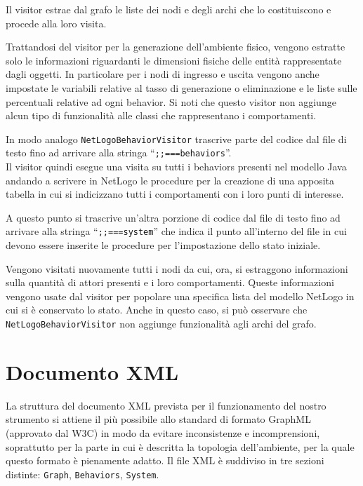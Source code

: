 Il visitor estrae dal grafo le liste dei nodi e degli archi che lo costituiscono e procede alla loro visita.

Trattandosi del visitor per la generazione dell'ambiente fisico, vengono estratte solo le informazioni riguardanti le dimensioni fisiche delle entità rappresentate dagli oggetti. In particolare per i nodi di ingresso e uscita vengono anche impostate le variabili relative al tasso di generazione o eliminazione e le liste sulle percentuali relative ad ogni behavior. Si noti che questo visitor non aggiunge alcun tipo di funzionalità alle classi che rappresentano i comportamenti.

In modo analogo \texttt{NetLogoBehaviorVisitor} trascrive parte del codice dal file di testo fino ad arrivare alla stringa “\texttt{;;===behaviors}”.\\
Il visitor quindi esegue una visita su tutti i behaviors presenti nel modello Java andando a scrivere in NetLogo le procedure per la creazione di una apposita tabella in cui si indicizzano tutti i comportamenti con i loro punti di interesse.

A questo punto si trascrive un'altra porzione di codice dal file di testo fino ad arrivare alla stringa “\texttt{;;===system}” che indica il punto all'interno del file in cui devono essere inserite le procedure per l'impostazione dello stato iniziale.

Vengono visitati nuovamente tutti i nodi da cui, ora, si estraggono informazioni sulla quantità di attori presenti e i loro comportamenti. Queste informazioni vengono usate dal visitor per popolare una specifica lista del modello NetLogo in cui si è conservato lo stato. Anche in questo caso, si può osservare che \texttt{NetLogoBehaviorVisitor} non aggiunge funzionalità agli archi del grafo. 

\section{Documento XML}
\label{sec:doc-xml}



La struttura del documento XML prevista per il funzionamento del nostro strumento si attiene il più possibile allo standard di formato GraphML \cite{graphml} (approvato dal W3C) in modo da evitare inconsistenze e incomprensioni, soprattutto per la parte in cui è descritta la topologia dell'ambiente, per la quale questo formato è pienamente adatto. Il file XML è suddiviso in tre sezioni distinte: \texttt{Graph}, \texttt{Behaviors}, \texttt{System}.

